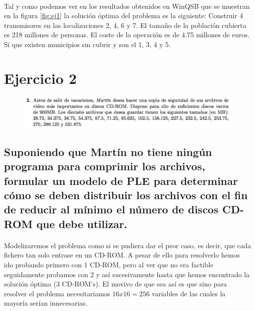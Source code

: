 \documentclass[10pt, a4paper]{article}
\begin{document}
			\paragraph{}
			Tal y como podemos ver en los resultados obtenidos en WinQSB que se muestran en la figura \ref{fig:ej1} la solución óptima del problema es la siguiente:
			\newline
			Construir 4 transmisores en las localizaciones 2, 4, 6 y 7.
			\newline
			El tamaño de la población cubierta es 218 millones de personas.
			\newline
			El coste de la operación es de 4.75 millones de euros.
			\newline
			Si que existen municipios sin cubrir y son el 1, 3, 4 y 5.


	\section{Ejercicio 2}

        \begin{figure}[H]
        \centering
            \includegraphics[width=\textwidth]{res/exercise-2.png}
        \end{figure}


		\subsection{Suponiendo que Martín no tiene ningún programa para comprimir los archivos, formular un modelo de PLE para determinar cómo se deben distribuir los archivos con el fin de reducir al mínimo el número de discos CD-ROM que debe utilizar.}

			\paragraph{}
			Modelizaremos el problema como si se pudiera dar el peor caso, es decir, que cada fichero tan solo entrase en un CD-ROM. A pesar de ello para resolverlo hemos ido probando primero con 1 CD-ROM, pero al ver que no era factible seguidamente probamos con 2 y así sucesivamente hasta que hemos encontrado la solución óptima (3 CD-ROM's). El movivo de que sea así es que sino para resolver el problema necesitariamos $16 x 16 = 256$ variables de las cuales la mayoría serían innecesarias.
\end{document}
